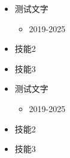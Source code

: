 \documentclass{resume}
\begin{document}
\begin{minipage}[t]{0.4\textwidth} 
    \begin{itemize}
        \item 测试文字
        \begin{itemize}
            \item 2019-2025
        \end{itemize}
        \item 技能2
        \item 技能3
    \end{itemize}
\end{minipage}%
\hfill 
\begin{minipage}[t]{0.5\textwidth} 
    \begin{itemize}
        \item 测试文字
        \begin{itemize}
            \item 2019-2025
        \end{itemize}
        \item 技能2
        \item 技能3
    \end{itemize}
\end{minipage}%
\end{document}
